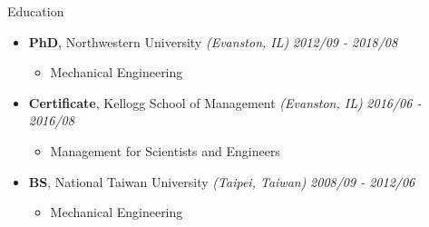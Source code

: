 \documentclass{resume} %
\begin{document}
\begin{rSection}{Education}
\begin{itemize}
	\item {\bf PhD}{, Northwestern University} \textit{(Evanston, IL)} \hfill {\em 2012/09 - 2018/08} 
	\vspace{-3mm}
	\begin{itemize}
		\setlength\itemsep{-3em}
		\item Mechanical Engineering
	\end{itemize}
	\item {\bf Certificate}{, Kellogg School of Management} \textit{(Evanston, IL)} \hfill {\em 2016/06 - 2016/08} 
	\vspace{-3mm}
	\begin{itemize}
		\setlength\itemsep{-3em}
		\item Management for Scientists and Engineers
	\end{itemize}
	\item {\bf BS}{, National Taiwan University} \textit{(Taipei, Taiwan)} \hfill {\em 2008/09 - 2012/06} 
	\vspace{-3mm}
	\begin{itemize}
		\setlength\itemsep{-3em}
		\item Mechanical Engineering
	\end{itemize}
\end{itemize}



\end{rSection}
\end{document}
